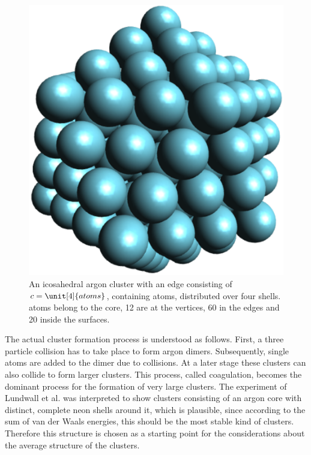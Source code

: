 \begin{figure}[!ht]
 \centering
 \includegraphics[scale=0.5]{pics/Ar_pure.eps}                        
 \caption{An icosahedral argon cluster with an edge consisting of 
          $c=\unit[4]{atoms}$, containing \unit[147]{atoms},
          distributed over four shells. \unit[55]{atoms} belong
          to the core, 12 are at the vertices, 60 in the edges and 20 inside the
          surfaces.}
 \label{figure:Ar_pure}
\end{figure}    

The actual cluster formation process is understood as follows. First, a three particle
collision has to take place to form argon dimers. Subsequently, single atoms are added to the dimer 
due to collisions. At a later stage these clusters can also collide to form larger clusters. This process,
called coagulation, becomes the dominant process for the formation of very large clusters. 
The experiment of Lundwall et al. \cite{Lundwall07} was interpreted to
show clusters consisting of an argon core with distinct, complete neon
shells around it, which is plausible, since according to the sum of van der Waals
energies, this should be the most stable kind of clusters.
Therefore this structure is chosen as a starting point for the considerations
about the average structure of the clusters.

